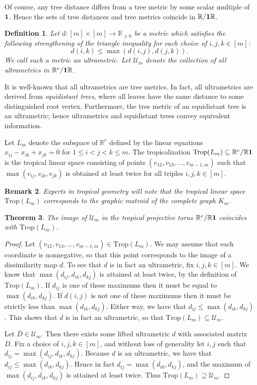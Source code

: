 \documentclass[12pt]{extarticle}
\newtheorem{theorem}{Theorem}
\numberwithin{theorem}{section}
\newtheorem{definition}[theorem]{Definition}
\newtheorem{remark}[theorem]{Remark}
\newcommand{\RR}{\mathbb{R}}
\newcommand{\Trop}{\text{Trop}}
\begin{document}
Of course, any tree distance differs from a tree metric by some scalar multiple of ${\bf 1}$. Hence the sets of tree distances and tree metrics coincide in $\mathbb R/{\bf 1}\RR$. 

\begin{definition}
Let $d:[m]\times [m]\to \mathbb R_{\geq 0}$ be a metric which satisfies the following strengthening of the triangle inequality for each choice of $i,j,k\in [m]$:
\[d(i,k)\leq \max(d(i,j),d(j,k)).\]
We call such a metric an \emph{ultrametric}. Let $\mathcal U_m$ denote the collection of all ultrametrics in $\mathbb R^e/{\bf 1}\mathbb R$.
\end{definition}

It is well-known that all ultrametrics are tree metrics. In fact, all ultrametrics are derived from \emph{equidistant trees}, where all leaves have the same distance to some distinguished root vertex. Furthermore, the tree metric of an equidistant tree is an ultrametric; hence ultrametrics and equidistant trees convey equivalent information.

Let $L_m$ denote the subspace of $\mathbb R^e$ defined by the linear equations $x_{ij} - x_{ik} + x_{jk}=0$ for $1\leq i < j <k \leq m$. The tropicalization $\Trop(L_m)\subseteq \RR^e/\RR {\bf 1}$ is the tropical linear space consisting of points $(v_{12},v_{13},\ldots, v_{m-1,m})$ such that $\max(v_{ij},v_{ik},v_{jk})$ is obtained at least twice for all triples $i,j,k\in [m]$.

\begin{remark}
Experts in tropical geometry will note that the tropical linear space $\Trop(L_m)$ corresponds to the graphic matroid of the complete graph $K_m$.
\end{remark}

\begin{theorem}
\label{ultrametrics}
The image of $\mathcal U_m$ in the tropical projective torus $\RR^e/\RR {\bf 1}$ coincides with $\Trop(L_m)$.
\end{theorem}
\begin{proof}
Let $(v_{12},v_{13},\ldots, v_{m-1,m})\in \Trop(L_m)$. We may assume that each coordinate is nonnegative, so that this point corresponds to the image of a dissimilarity map $d$. To see that $d$ is in fact an ultrametric, fix $i,j,k\in [m]$. We know that $\max(d_{ij},d_{ik}, d_{kj})$ is attained at least twice, by the definition of $\Trop(L_m)$. If $d_{ij}$ is one of these maximums then it must be equal to $\max(d_{ik},d_{kj})$. If $d(i,j)$ is not one of these maximums then it must be strictly less than $\max(d_{ik},d_{kj})$. Either way, we have that $d_{ij}\leq \max(d_{ik},d_{kj})$. This shows that $d$ is in fact an ultrametric, so that $\Trop(L_m)\subseteq \mathcal U_m$.

Let $\bar D\in \mathcal U_m$. Then there exists some lifted ultrametric $d$ with associated matrix $D$. Fix a choice of $i,j,k\in [m]$, and without loss of generality let $i,j$ such that $d_{ij}=\max(d_{ij},d_{ik},d_{kj})$. Because $d$ is an ultrametric, we have that $d_{ij}\leq \max(d_{ik},d_{kj})$.  Hence in fact $d_{ij}=\max(d_{ik},d_{kj})$, and the maximum of $\max(d_{ij},d_{ik},d_{kj})$ is attained at least twice. Thus $\Trop(L_m)\supseteq \mathcal U_m$.
\end{proof}
\end{document}
